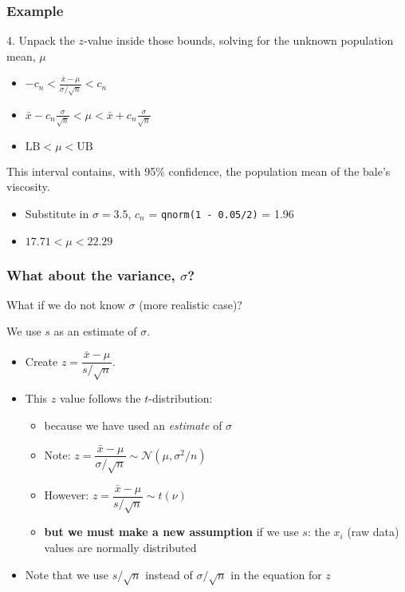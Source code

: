 \begin{frame}\frametitle{Example}
	4. Unpack the $z$-value inside those bounds, solving for the unknown population mean, $\mu$
	\begin{itemize}
		\item	$\displaystyle - c_n < \frac{\bar{x} - \mu}{\sigma / \sqrt{n}} < c_n$
		\item	$\displaystyle \bar{x} - c_n\frac{\sigma}{\sqrt{n}} < \mu < \bar{x} + c_n\frac{\sigma}{\sqrt{n}}$
		\item	$\displaystyle \text{LB} < \mu < \text{UB}$
	\end{itemize}

	This interval contains, with 95\% confidence, the population mean of the bale's viscosity.
	\begin{itemize}
		\item	Substitute in $\sigma = 3.5$, $c_n$ = \texttt{qnorm(1 - 0.05/2)} = 1.96
		\item	$17.71 < \mu < 22.29$
	\end{itemize}
\end{frame}

\begin{frame}\frametitle{What about the variance, $\sigma$?}

	What if we do not know $\sigma$ (more realistic case)?

	We use $s$ as an estimate of $\sigma$.
	\begin{itemize}
		\item	Create $z = \dfrac{\bar{x} - \mu}{s/\sqrt{n}}$.
		\item	This $z$ value follows the $t$-distribution:
		\begin{itemize}
			\item	because we have used an \emph{estimate} of $\sigma$
			\vspace{6pt}
			\item	Note: $z = \dfrac{\bar{x} - \mu}{\sigma/\sqrt{n}} \sim \mathcal{N}(\mu, \sigma^2/n)$
			\vspace{6pt}
			\item	However: $z = \dfrac{\bar{x} - \mu}{s/\sqrt{n}} \sim t\left(\nu\right)$
			\vspace{6pt}
			\item	\textbf{\color{myOrange}but we must make a new assumption} if we use $s$: the $x_i$ (raw data) values are normally distributed
		\end{itemize}
		\item	Note that we use $s/\sqrt{n}$ instead of $\sigma/\sqrt{n}$ in the equation for $z$
	\end{itemize}
\end{frame}

